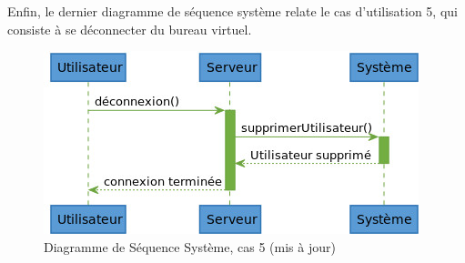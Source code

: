 Enfin, le dernier diagramme de séquence système relate le cas d'utilisation
5, qui consiste à se déconnecter du bureau virtuel.

\begin{figure}[h!]
	\centering
	\includegraphics[scale=0.4]{diagrammes/dss5.jpg}
	\caption{\color{ForestGreen}Diagramme de Séquence Système, cas 5 (mis à jour)\color{black}}
\end{figure}
